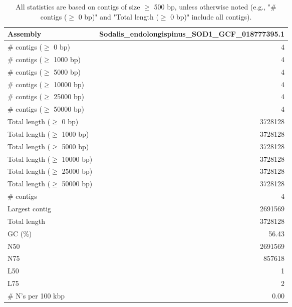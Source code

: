 \documentclass[12pt,a4paper]{article}
\begin{document}
\begin{table}[ht]
\begin{center}
\caption{All statistics are based on contigs of size $\geq$ 500 bp, unless otherwise noted (e.g., "\# contigs ($\geq$ 0 bp)" and "Total length ($\geq$ 0 bp)" include all contigs).}
\begin{tabular}{|l*{1}{|r}|}
\hline
Assembly & Sodalis\_endolongispinus\_SOD1\_GCF\_018777395.1 \\ \hline
\# contigs ($\geq$ 0 bp) & 4 \\ \hline
\# contigs ($\geq$ 1000 bp) & 4 \\ \hline
\# contigs ($\geq$ 5000 bp) & 4 \\ \hline
\# contigs ($\geq$ 10000 bp) & 4 \\ \hline
\# contigs ($\geq$ 25000 bp) & 4 \\ \hline
\# contigs ($\geq$ 50000 bp) & 4 \\ \hline
Total length ($\geq$ 0 bp) & 3728128 \\ \hline
Total length ($\geq$ 1000 bp) & 3728128 \\ \hline
Total length ($\geq$ 5000 bp) & 3728128 \\ \hline
Total length ($\geq$ 10000 bp) & 3728128 \\ \hline
Total length ($\geq$ 25000 bp) & 3728128 \\ \hline
Total length ($\geq$ 50000 bp) & 3728128 \\ \hline
\# contigs & 4 \\ \hline
Largest contig & 2691569 \\ \hline
Total length & 3728128 \\ \hline
GC (\%) & 56.43 \\ \hline
N50 & 2691569 \\ \hline
N75 & 857618 \\ \hline
L50 & 1 \\ \hline
L75 & 2 \\ \hline
\# N's per 100 kbp & 0.00 \\ \hline
\end{tabular}
\end{center}
\end{table}
\end{document}
